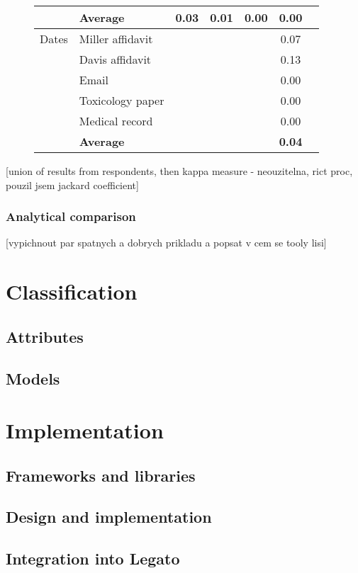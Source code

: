 \documentclass[
  digital, %
  table,   %
  lof,     %
  lot,     %
]{fithesis3}
\begin{document}
\begin{figure}
\begin{tabular}{|l||l||*{5}{c|}}
& \textbf{Average} &\textbf{0.03}&\textbf{0.01}&\textbf{0.00}&\textbf{0.00}\\\hline\hline
Dates & Miller affidavit &&&&0.07\\\hline
& Davis affidavit &&&&0.13\\\hline
& Email &&&&0.00\\\hline
& Toxicology paper &&&&0.00\\\hline
& Medical record &&&&0.00\\\hline\hline
& \textbf{Average} &&&&\textbf{0.04}\\\hline\hline
\end{tabular}
\normalsize
\end{figure}

[union of results from respondents, then kappa measure - neouzitelna, rict proc, pouzil jsem jackard coefficient]

\subsection{Analytical comparison}
[vypichnout par spatnych a dobrych prikladu a popsat v cem se tooly lisi]


\chapter{Classification}
\section{Attributes}
\section{Models}

\chapter{Implementation}
\section{Frameworks and libraries}
\section{Design and implementation}
\section{Integration into Legato}
\end{document}
